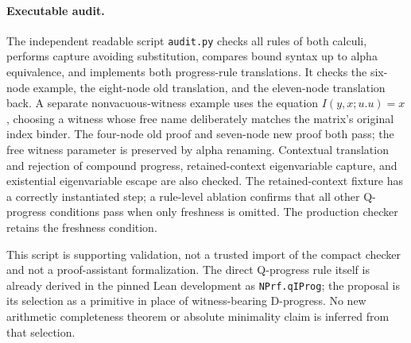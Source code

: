 \paragraph{Executable audit.}
The independent readable script \texttt{audit.py} checks all rules of both
calculi, performs capture avoiding substitution, compares bound syntax up
to alpha equivalence, and implements both progress-rule translations. It
checks the six-node example, the eight-node old translation, and the
eleven-node translation back. A separate nonvacuous-witness example uses
the equation $I(y,x;u.u)=x$, choosing a witness whose free name deliberately
matches the matrix's original index binder. The four-node old proof and
seven-node new proof both pass; the free witness parameter is preserved
by alpha renaming. Contextual translation and rejection of compound
progress, retained-context eigenvariable capture, and existential
eigenvariable escape are also checked. The retained-context fixture has
a correctly instantiated step; a rule-level ablation confirms that all
other Q-progress conditions pass when only freshness is omitted. The
production checker retains the freshness condition.

This script is supporting validation, not a trusted import of the compact
checker and not a proof-assistant formalization. The direct Q-progress
rule itself is already derived in the pinned Lean development as
\texttt{NPrf.qIProg}; the proposal is its selection as a primitive in place
of witness-bearing D-progress. No new arithmetic completeness theorem or
absolute minimality claim is inferred from that selection.
